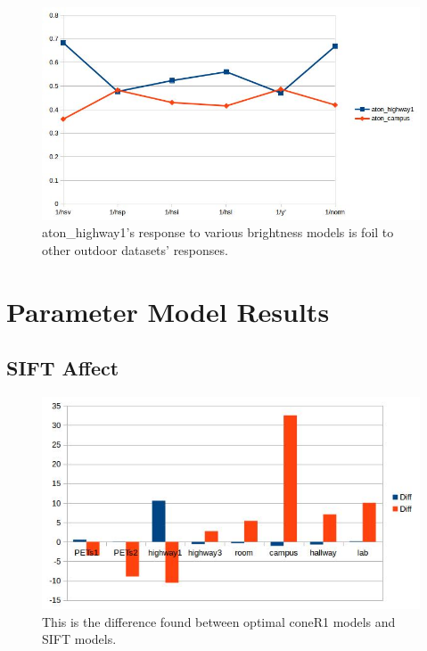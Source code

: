\documentclass[12pt]{report}
\begin{document}
\begin{figure}
\centering
  \includegraphics[width=1\linewidth]{figures/brightness/db/highway1_reciprocal.jpg}
\caption{aton\_highway1's response to various brightness models is foil to other outdoor datasets' responses.}
\label{fig:highway1_reciprocal}
\end{figure}

\section{Parameter Model Results}

\subsection{SIFT Affect}

\begin{figure}
\centering
  \includegraphics[width=1\linewidth]{figures/sift_diff.jpg}
\caption{This is the difference found between optimal coneR1 models and SIFT models.}
\label{fig:highway1_reciprocal}
\end{figure}
\end{document}
